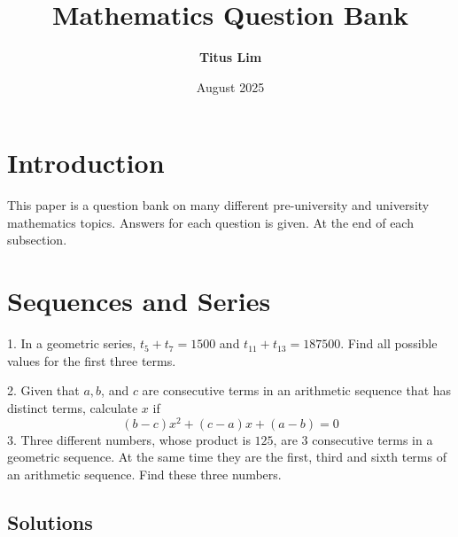 \documentclass[12pt]{article}
\title{Mathematics Question Bank}
\author{\textbf{Titus Lim}}
\date{August 2025}
\begin{document}
\begin{titlingpage}
	\maketitle
\end{titlingpage}

\tableofcontents
\newpage

\section*{Introduction}

This paper is a question bank on many different pre-university and university mathematics topics. Answers for each question is given. At the end of each subsection.

\section{Sequences and Series}

1. In a geometric series, $t_5 + t_7 = 1500$ and $t_{11}+t_{13}=187500$. Find all possible values for the first three terms.

2. Given that $a, b$, and $c$ are consecutive terms in an arithmetic sequence that has distinct terms, calculate $x$ if
\[
	(b-c)x^2+(c-a)x+(a-b)=0
\]
3. Three different numbers, whose product is $125$, are $3$ consecutive terms in a geometric sequence. At the same time they are the first, third and sixth terms of an arithmetic sequence. Find these three numbers.

\subsection{Solutions}
\end{document}
